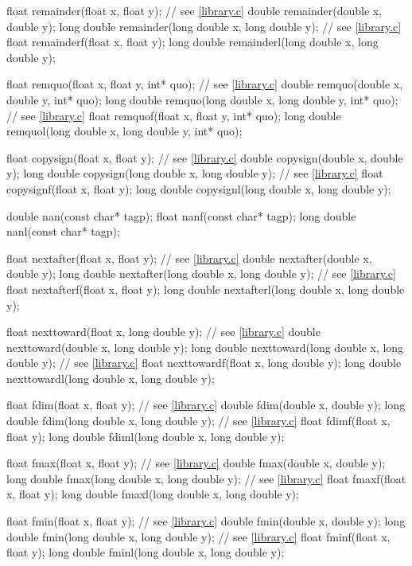 \begin{codeblock}
{  float remainder(float x, float y);    // see \ref{library.c}
  double remainder(double x, double y);
  long double remainder(long double x, long double y);  // see \ref{library.c}
  float remainderf(float x, float y);
  long double remainderl(long double x, long double y);

  float remquo(float x, float y, int* quo);     // see \ref{library.c}
  double remquo(double x, double y, int* quo);
  long double remquo(long double x, long double y, int* quo);   // see \ref{library.c}
  float remquof(float x, float y, int* quo);
  long double remquol(long double x, long double y, int* quo);

  float copysign(float x, float y);     // see \ref{library.c}
  double copysign(double x, double y);
  long double copysign(long double x, long double y);   // see \ref{library.c}
  float copysignf(float x, float y);
  long double copysignl(long double x, long double y);

  double nan(const char* tagp);
  float nanf(const char* tagp);
  long double nanl(const char* tagp);

  float nextafter(float x, float y);    // see \ref{library.c}
  double nextafter(double x, double y);
  long double nextafter(long double x, long double y);  // see \ref{library.c}
  float nextafterf(float x, float y);
  long double nextafterl(long double x, long double y);

  float nexttoward(float x, long double y);     // see \ref{library.c}
  double nexttoward(double x, long double y);
  long double nexttoward(long double x, long double y);     // see \ref{library.c}
  float nexttowardf(float x, long double y);
  long double nexttowardl(long double x, long double y);

  float fdim(float x, float y);         // see \ref{library.c}
  double fdim(double x, double y);
  long double fdim(long double x, long double y);   // see \ref{library.c}
  float fdimf(float x, float y);
  long double fdiml(long double x, long double y);

  float fmax(float x, float y);         // see \ref{library.c}
  double fmax(double x, double y);
  long double fmax(long double x, long double y);   // see \ref{library.c}
  float fmaxf(float x, float y);
  long double fmaxl(long double x, long double y);

  float fmin(float x, float y);         // see \ref{library.c}
  double fmin(double x, double y);
  long double fmin(long double x, long double y);   // see \ref{library.c}
  float fminf(float x, float y);
  long double fminl(long double x, long double y);

}
\end{codeblock}
